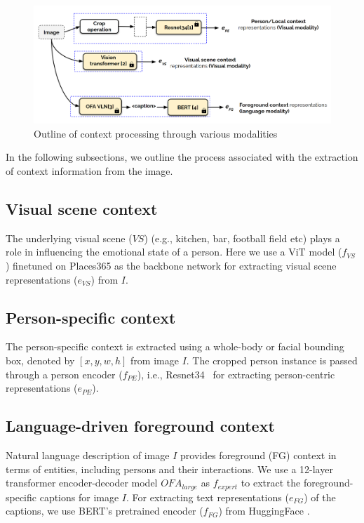 \begin{figure}
    \centering
    \includegraphics[width=\textwidth]{figures/context_extraction_multimodality.png}
    \caption{Outline of context processing through various modalities}
    \label{context_extraction}
\end{figure}
In the following subsections, we outline the process associated with the extraction of context information from the image.

\subsection{Visual scene context}
The underlying visual scene ($VS$) (e.g.,  kitchen, bar, football field etc) plays a role in influencing the emotional state of a person. Here we use a ViT \cite{Dosovitskiy2021AnII} model ($f_{VS}$) finetuned on Places365 \cite{zhou2017places} as the backbone network for extracting visual scene representations ($e_{VS}$) from $I$.
\subsection{Person-specific context}
The person-specific context is extracted using a whole-body or facial bounding box, denoted by $[x,y,w,h]$ from image $I$. The cropped person instance is passed through a person encoder ($f_{PE}$), i.e., Resnet34~\cite{He2016DeepRL} for extracting person-centric representations ($e_{PE}$). 
\subsection{Language-driven foreground context}
 Natural language description of image $I$ provides foreground (FG) context in terms of entities, including persons and their interactions. We use a 12-layer transformer encoder-decoder model $OFA_{large}$ \cite{wang2022ofa} as $f_{expert}$ to extract the foreground-specific captions for image $I$. For extracting text representations ($e_{FG}$) of the captions, we use BERT's \cite{Devlin2019BERT} pretrained encoder ($f_{FG}$) from HuggingFace \cite{wolf-etal-2020-transformers}.
